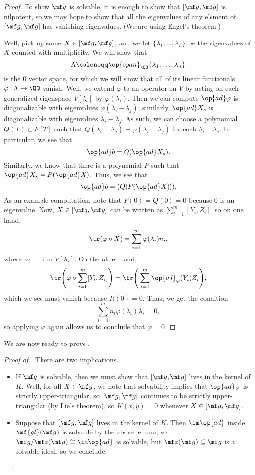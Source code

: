\documentclass[../notes.tex]{subfiles}
\begin{document}
\begin{proof}
	To show $\mf g$ is solvable, it is enough to show that $[\mf g,\mf g]$ is nilpotent, so we may hope to show that all the eigenvalues of any element of $[\mf g,\mf g]$ has vanishing eigenvalues. (We are using Engel's theorem.)
	
	Well, pick up some $X\in[\mf g,\mf g]$, and we let $\{\lambda_1,\ldots,\lambda_n\}$ be the eigenvalues of $X$ counted with multiplicity. We will show that
	\[\Lambda\coloneqq\op{span}_\QQ\{\lambda_1,\ldots,\lambda_n\}\]
	is the $0$ vector space, for which we will show that all of its linear functionals $\varphi\colon\Lambda\to\QQ$ vanish. Well, we extend $\varphi$ to an operator on $V$ by acting on each generalized eigenspace $V[\lambda_i]$ by $\varphi(\lambda_i)$. Then we can compute $\op{ad}\varphi$ is diagonalizable with eigenvalues $\varphi(\lambda_i-\lambda_j)$; similarly, $\op{ad}X_s$ is diagonalizable with eigenvalues $\lambda_i-\lambda_j$. As such, we can choose a polynomial $Q(T)\in F[T]$ such that $Q(\lambda_i-\lambda_j)=\varphi(\lambda_i-\lambda_j)$ for each $\lambda_i-\lambda_j$. In particular, we see that
	\[\op{ad}b=Q(\op{ad}X_s).\]
	Similarly, we know that there is a polynomial $P$ such that $\op{ad}X_s=P(\op{ad}X)$. Thus, we see that
	\[\op{ad}b=(Q(P(\op{ad}X))).\]
	As an example computation, note that $P(0)=Q(0)=0$ because $0$ is an eigenvalue. Now, $X\in[\mf g,\mf g]$ can be written as $\sum_{i=1}^m[Y_i,Z_i]$, so on one hand,
	\[\tr(\varphi\circ X)=\sum_{i=1}^m\varphi(\lambda_i)n_i,\]
	where $n_i=\dim V[\lambda_i]$. On the other hand,
	\[\tr\Bigg(\varphi\circ\sum_{i=1}^m[Y_i,Z_i]\Bigg)=\tr\Bigg(\sum_{i=1}^m\op{ad}_\varphi(Y_i)Z_i\Bigg),\]
	which we see must vanish because $R(0)=0$. Thus, we get the condition
	\[\sum_{i=1}^mn_i\varphi(\lambda_i)\lambda_i=0,\]
	so applying $\varphi$ again allows us to conclude that $\varphi=0$.
\end{proof}
We are now ready to prove .
\begin{proof}[Proof of ]
	There are two implications.
	\begin{itemize}
		\item If $\mf g$ is solvable, then we must show that $[\mf g,\mf g]$ lives in the kernel of $K$. Well, for all $X\in\mf g$, we note that solvability implies that $\op{ad}_X$ is strictly upper-triangular, so $[\mf g,\mf g]$ continues to be strictly upper-triangular (by Lie's theorem), so $K(x,y)=0$ whenever $X\in[\mf g,\mf g]$.
		\item Suppose that $[\mf g,\mf g]$ lives in the kernel of $K$. Then $\im\op{ad}$ inside $\mf{gl}(\mf g)$ is solvable by the above lemma, so $\mf g/\mf z(\mf g)\cong\im\op{ad}$ is solvable, but $\mf z(\mf g)\subseteq\mf g$ is a solvable ideal, so we conclude.
		\qedhere
	\end{itemize}
\end{proof}
\end{document}
